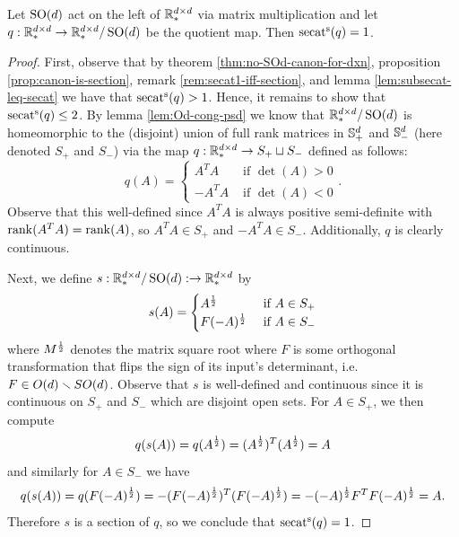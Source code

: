 \begin{proposition}\label{prop:SOd-secat-1}
    Let $\SO(d)$ act on the left of $\R^{d \times d}_*$ via matrix multiplication and let $q : \R^{d \times d}_* \to \R^{d \times d}_* / \SO(d)$ be the quotient map.
    Then $\ssecat(q) = 1$.
    \begin{proof}
        First, observe that by theorem \ref{thm:no-SOd-canon-for-dxn}, proposition \ref{prop:canon-is-section}, remark \ref{rem:secat1-iff-section}, and lemma \ref{lem:subsecat-leq-secat} we have that $\ssecat(q) > 1$.
        Hence, it remains to show that $\ssecat(q) \leq 2$.
        By lemma \ref{lem:Od-cong-psd} we know that $\R^{d \times d}_*/\SO(d)$ is homeomorphic to the (disjoint) union of full rank matrices in $\S^d_+$ and $\S^d_-$ (here denoted $S_+$ and $S_-$) via the map $q : \R^{d \times d}_* \to S_+ \sqcup S_-$ defined as follows:
        \[
            q(A) = 
            \begin{cases}
                A^T A &\text{ if } \det(A) > 0 \\
                -A^T A &\text{ if } \det(A) < 0
            \end{cases}.
        \]
        Observe that this well-defined since $A^T A$ is always positive semi-definite with $\rank(A^T A) = \rank(A)$, so $A^T A \in S_+$ and $-A^T A \in S_-$.
        Additionally, $q$ is clearly continuous.

        Next, we define $s : \R^{d \times d}_*/\SO(d) : \to \R^{d \times d}_*$ by
        \[
            s(A) = 
            \begin{cases}
                A^{\f12}        &\tif A \in S_+ \\
                F(-A)^{\f12}    &\tif A \in S_-
            \end{cases}
        \]
        where $M^{\f12}$ denotes the matrix square root where $F$ is some orthogonal transformation that flips the sign of its input's determinant, i.e. $F \in O(d) \sminus SO(d)$.
        Observe that $s$ is well-defined and continuous since it is continuous on $S_+$ and $S_-$ which are disjoint open sets.
        For $A \in S_+$, we then compute
        \[
            q(s(A))
            = q(A^{\f12})
            = (A^{\f12})^T (A^{\f12})
            = A
        \]
        and similarly for $A \in S_-$ we have
        \[
            q(s(A))
            = q(F(-A)^{\f12})
            = -(F(-A)^{\f12})^T (F(-A)^{\f12})
            = -(-A)^{\f12} F^T F (-A)^{\f12}
            = A.
        \]
        Therefore $s$ is a section of $q$, so we conclude that $\ssecat(q) = 1$.
    \end{proof}
\end{proposition}

